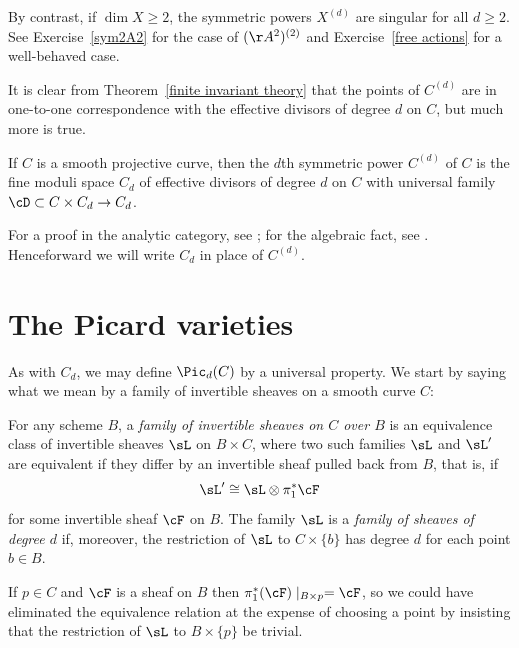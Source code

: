 By contrast, if $\dim X \geq 2$, the symmetric powers $X^{(d)}$ are singular for all $d \geq 2$.
See Exercise~\ref{sym2A2} for the case of $(\AA^2)^{(2)}$ and Exercise~\ref{free actions} for a well-behaved case.

It is clear from Theorem~\ref{finite invariant theory} that the points of $C^{(d)}$ are in one-to-one correspondence with the effective divisors of
degree $d$ on $C$, but much more is true. 

\begin{theorem}
If $C$ is a smooth projective curve, then the $d$th symmetric power $C^{(d)}$ of $C$ is the fine moduli space $C_d$ of effective divisors of degree $d$ on $C$ with universal family $\cD\subset C\times C_d \to C_d$.
\end{theorem}

For a proof in the analytic category, see \cite[p. 164]{ACGH}; for the algebraic fact, see \cite[Remark 9.3.9]{Kleiman-PicardScheme}.
Henceforward we will write $C_d$ in place of $C^{(d)}$.



\section{The Picard varieties}\label{Picard section}

As with $C_d$, we may define $\Pic_d(C)$ by a universal property. We start by saying what we mean by a family of invertible sheaves on a smooth curve $C$:

\begin{definition}
 For any scheme $B$, a \emph{family of invertible sheaves on $C$ over $B$} is an equivalence class of invertible sheaves $\sL$ on $B\times C$, where two such
 families $\sL$ and $\sL'$ are equivalent if they differ by an invertible sheaf pulled back from $B$, that is, if
 $$
 \sL' \cong \sL \otimes \pi_1^*\cF
 $$
for some invertible sheaf $\cF$ on $B$.
The family $\sL$  is a \emph{family of sheaves of degree $d$} if, moreover, the restriction of $\sL$
 to $C\times \{b\}$ has degree $d$ for each point $b\in B$. 
 \end{definition}

If $p \in C$ and $\cF$ is a sheaf on $B$ then $\pi_1^*(\cF)\mid_{B\times p} = \cF$, so we could have eliminated the
equivalence relation at the expense of choosing a point by insisting that the restriction of $\sL$ to $B \times \{p\}$ be trivial.
 

